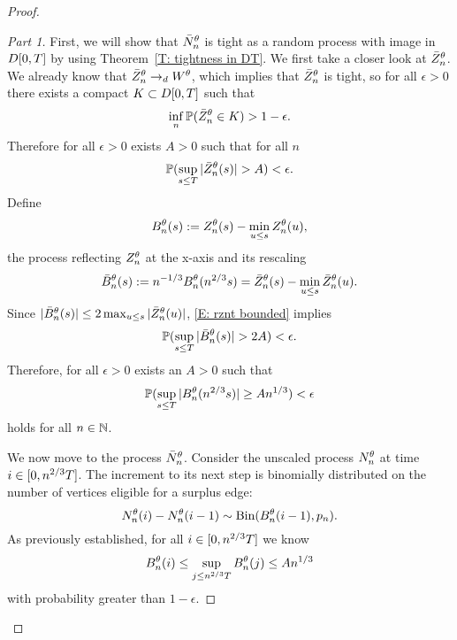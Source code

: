 \begin{proof}
\begin{proof}[Part 1]\renewcommand{\qedsymbol}{}
First, we will show that $\bar{N}_n^{\theta}$ is tight as a random process with image in $D[0, T]$ by using Theorem~\ref{T: tightness in DT}.
We first take a closer look at $\bar{Z}^{\theta}_n$.
We already know that $\bar{Z}^{\theta}_n \rightarrow_d W^{\theta}$, which implies that $\bar{Z}^{\theta}_n$ is tight, 
so for all $\epsilon>0$ there exists a compact $K \subset D[0, T]$ such that
\begin{equation} \label{E: rznt tight}
\inf_n \mathbb{P} ( \bar{Z}^{\theta}_n \in K) > 1 - \epsilon.
\end{equation}
Therefore for all $\epsilon > 0$ exists $A>0$ such that for all $n$
\begin{equation} \label{E: rznt bounded}
\mathbb{P}(\sup_{s \leq T} |\bar{Z}^{\theta}_n(s)| > A) < \epsilon.
\end{equation}
Define 
\begin{equation}
	B_n^{\theta}(s) := Z_n^{\theta}(s) - \min_{u \leq s}Z_n^{\theta}(u),
\end{equation}
the process reflecting $Z_n^{\theta}$ at the x-axis and its rescaling
\begin{equation}
	\bar{B}_n^{\theta}(s) := n^{-1 / 3}B_n^{\theta}(n^{2 / 3}s) = \bar{Z}^{\theta}_n(s) - \min_{u \leq s}\bar{Z}^{\theta}_n(u).
\end{equation}
Since $|\bar{B}_n^{\theta}(s)| \leq 2\max_{u \leq s}|\bar{Z}^{\theta}_n(u)|$, \eqref{E: rznt bounded} implies
\begin{equation} \label{E: rzminz bounded}
\mathbb{P}(\sup_{s \leq T} |\bar{B}_n^{\theta}(s)| > 2A) < \epsilon.
\end{equation}
Therefore, for all $\epsilon > 0$ exists an $A>0$ such that
\begin{equation}
\mathbb{P}( \sup_{s \leq T} |B_n^{\theta}(n^{2 / 3}s)| \geq An^{1 / 3} ) < \epsilon
\end{equation}
holds for all $n \in \mathbb{N}$.

\bigskip

We now move to the process $\bar{N}_n^{\theta}$. Consider the unscaled process $N_n^{\theta}$ at time $i \in [0, n^{2 / 3}T]$.
The increment to its next step is binomially distributed on the number of vertices eligible for a surplus edge:
\begin{equation}
N_n^{\theta}(i) - N_n^{\theta}(i-1) \sim \operatorname*{Bin}(B_n^{\theta}(i-1), p_n).
\end{equation}
As previously established, for all $i \in [0, n^{2 / 3}T]$ we know 
\begin{equation}
	B_n^{\theta}(i) \leq \sup_{j \leq n^{2 / 3}T} B_n^{\theta}(j) \leq An^{1 / 3}
\end{equation}
with probability greater than $1-\epsilon$.


\end{proof}
\end{proof}
